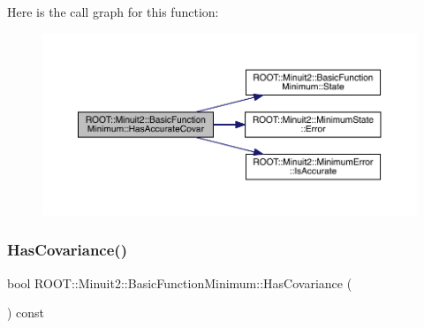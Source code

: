 Here is the call graph for this function\+:
\nopagebreak
\begin{figure}[H]
\begin{center}
\leavevmode
\includegraphics[width=350pt]{de/d25/classROOT_1_1Minuit2_1_1BasicFunctionMinimum_acc1e5d50ec4abe632af93c5dcebd9c0e_cgraph}
\end{center}
\end{figure}
\mbox{\label{classROOT_1_1Minuit2_1_1BasicFunctionMinimum_ac876224368add09ceab711d3515fd959}} 
\subsubsection{\texorpdfstring{HasCovariance()}{HasCovariance()}\hspace{0.1cm}{\footnotesize\ttfamily [1/3]}}
{\footnotesize\ttfamily bool R\+O\+O\+T\+::\+Minuit2\+::\+Basic\+Function\+Minimum\+::\+Has\+Covariance (\begin{DoxyParamCaption}{ }\end{DoxyParamCaption}) const\hspace{0.3cm}{\ttfamily [inline]}}

